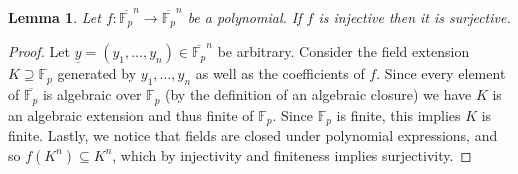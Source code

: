 \documentclass[12pt]{article}
\theoremstyle{plain}
\newtheorem{lemma}[thm]{Lemma}
\theoremstyle{definition}
\newcommand{\bb}[1]{\mathbb{#1}}
\newcommand{\lto}{\longrightarrow}
\begin{document}
	
	
	
	
	
	
	
	
	
	
	
	
	
	
	
	
	
	
	
	
	
	\begin{lemma}\label{lem:finite_characteristic_ax}
		Let $f: \overline{\bb{F}_p}^n \lto \overline{\bb{F}_p}^n$ be a polynomial. If $f$ is injective then it is surjective.
		\end{lemma}
	\begin{proof}
		Let $\underline{y} = (y_1,\ldots, y_n) \in \overline{\bb{F}_p}^n$ be arbitrary. Consider the field extension $K \supseteq \bb{F}_p$ generated by $y_1,\ldots, y_n$ as well as the coefficients of $f$. Since every element of $\overline{\bb{F}_p}$ is algebraic over $\bb{F}_p$ (by the definition of an algebraic closure) we have $K$ is an algebraic extension and thus finite of $\bb{F}_p$. Since $\bb{F}_p$ is finite, this implies $K$ is finite. Lastly, we notice that fields are closed under polynomial expressions, and so $f(K^n) \subseteq K^n$, which by injectivity and finiteness implies surjectivity.
		\end{proof}
	
\end{document}

